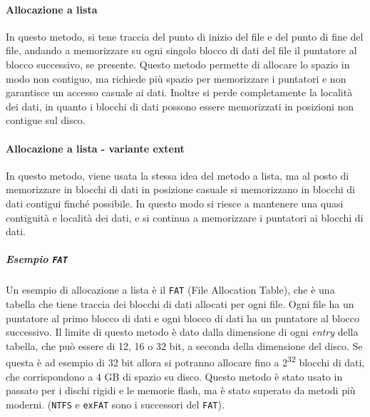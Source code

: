         \paragraph{Allocazione a lista} In questo metodo, si tene traccia del punto di inizio del file e del punto di fine del file, andando a memorizzare su ogni singolo blocco di dati del file il puntatore al blocco successivo, se presente. Questo metodo permette di allocare lo spazio in modo non contiguo, ma richiede più spazio per memorizzare i puntatori e non garantisce un accesso casuale ai dati. Inoltre si perde completamente la località dei dati, in quanto i blocchi di dati possono essere memorizzati in posizioni non contigue sul disco.
        \paragraph{Allocazione a lista - variante extent} In questo metodo, viene usata la stessa idea del metodo a lista, ma al posto di memorizzare in blocchi di dati in posizione casuale si memorizzano in blocchi di dati contigui finché possibile. In questo modo si riesce a mantenere una quasi contiguità e località dei dati, e si continua a memorizzare i puntatori ai blocchi di dati. 
            \subparagraph{Esempio \texttt{FAT}} Un esempio di allocazione a lista è il \texttt{FAT} (File Allocation Table), che è una tabella che tiene traccia dei blocchi di dati allocati per ogni file. Ogni file ha un puntatore al primo blocco di dati e ogni blocco di dati ha un puntatore al blocco successivo. Il limite di questo metodo è dato dalla dimensione di ogni \textit{entry} della tabella, che può essere di 12, 16 o 32 bit, a seconda della dimensione del disco. Se questa è ad esempio di 32 bit allora si potranno allocare fino a 2\textsuperscript{32} blocchi di dati, che corrispondono a 4 GB di spazio su disco. Questo metodo è stato usato in passato per i dischi rigidi e le memorie flash, ma è stato superato da metodi più moderni. (\texttt{NTFS} e \texttt{exFAT} sono i successori del \texttt{FAT}).
